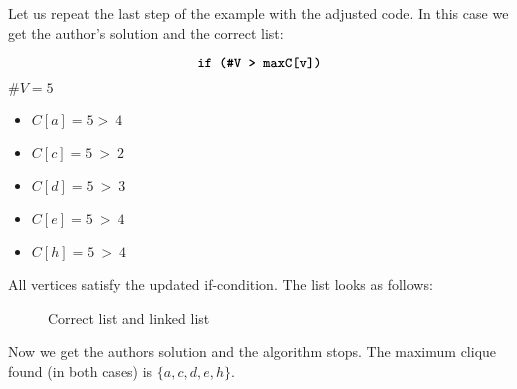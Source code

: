 \documentclass[12pt, xcolor=dvipsnames]{scrartcl}
\theoremstyle{definition}
\newcommand{\card}[1]{\# #1}
\theoremstyle{definition}
\begin{document}
        Let us repeat the last step of the example with the adjusted code.
        In this case we get the author's solution and the correct list:

        \[ \textbf{\texttt{if (\#V > maxC[v])}} \]

        $\card V = 5 $

        \begin{itemize}
          \item[\textcolor{Green}{\textbullet}] $C[a] = 5 >~ 4$ 
          \item[\textcolor{Green}{\textbullet}] $C[c] = 5 ~>~ 2$
          \item[\textcolor{Green}{\textbullet}] $C[d] = 5 ~>~ 3$
          \item[\textcolor{Green}{\textbullet}] $C[e] = 5 ~>~ 4$
          \item[\textcolor{Green}{\textbullet}] $C[h] = 5 ~>~ 4$
        \end{itemize}

        All vertices satisfy the updated if-condition.
        The list looks as follows:

        \begin{figure}[H]
          \centering
        \caption{Correct list and linked list}
        \end{figure}

        Now we get the authors solution and the algorithm stops.
        The maximum clique found (in both cases) is $\{a,c,d,e,h\}$.

  
   
\end{document}
